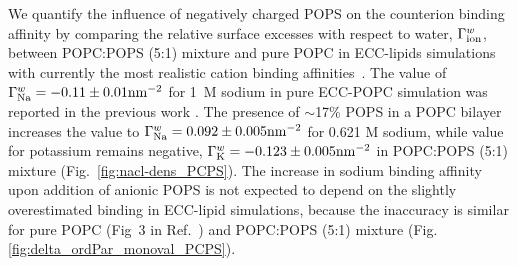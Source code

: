 \documentclass[journal=jctcce,manuscript=article]{achemso}
\begin{document}
We quantify the influence of negatively charged POPS on the counterion binding affinity
by comparing the relative surface excesses with respect to water, $\Gamma ^{w} _{\rm ion}$,
between POPC:POPS (5:1) mixture and pure POPC in ECC-lipids simulations with currently the most realistic
cation binding affinities~\cite{melcr18}.
The value of $\Gamma ^{w} _{\rm Na}=-0.11 \pm 0.01 \mathrm{nm}^{-2}$ for 1~M sodium in pure ECC-POPC
simulation was reported in the previous work \cite{melcr18}.
The presence of $\sim$17\% POPS in a POPC bilayer increases the
value to $\Gamma ^{w} _{\rm Na}=0.092 \pm 0.005 \mathrm{nm}^{-2}$ 
for 0.621 M sodium, while value for potassium remains negative,
$\Gamma ^{w} _{\rm K}=-0.123 \pm 0.005 \mathrm{nm}^{-2}$ in POPC:POPS (5:1) mixture (Fig.~\ref{fig:nacl-dens_PCPS}).
The increase in sodium binding affinity upon addition of anionic POPS is not expected to depend on
the slightly overestimated  binding in ECC-lipid simulations, because the
inaccuracy is similar for pure POPC (Fig~3 in Ref.~) and POPC:POPS (5:1) mixture (Fig. \ref{fig:delta_ordPar_monoval_PCPS}).
\end{document}
